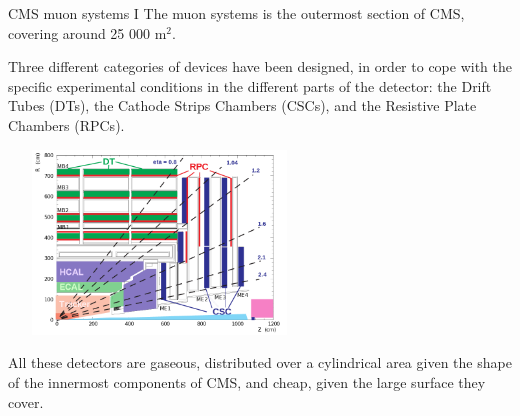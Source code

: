 \documentclass[8pt]{beamer}
\begin{document}
\begin{frame}{CMS muon systems I}
\justifying
The muon systems is the outermost section of CMS, covering around 25 000 m$^2$. \vfill 

Three different categories of devices have been designed, in order to cope with the specific experimental conditions in the different parts of the detector: the Drift Tubes (DTs), the Cathode Strips Chambers (CSCs), and the Resistive Plate Chambers (RPCs). \vfill

\begin{center}
\includegraphics[width=8cm, height=4.9cm]{figs/CMSMuons.png}
\end{center} \vfill

All these detectors are gaseous, distributed over a cylindrical area given the shape of the innermost components of CMS, and cheap, given the large surface they cover. \vfill
\end{frame}
\end{document}
